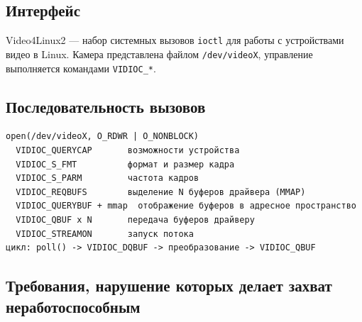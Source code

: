 \documentclass[11pt,a4paper]{article}
\theoremstyle{definition}
\theoremstyle{remark}
\begin{document}
\subsection{Интерфейс}

Video4Linux2 --- набор системных вызовов \texttt{ioctl} для работы с
устройствами видео в Linux. Камера представлена файлом \texttt{/dev/videoX},
управление выполняется командами \texttt{VIDIOC\_*}.

\subsection{Последовательность вызовов}

\begin{lstlisting}[style=shell]
open(/dev/videoX, O_RDWR | O_NONBLOCK)
  VIDIOC_QUERYCAP       возможности устройства
  VIDIOC_S_FMT          формат и размер кадра
  VIDIOC_S_PARM         частота кадров
  VIDIOC_REQBUFS        выделение N буферов драйвера (MMAP)
  VIDIOC_QUERYBUF + mmap  отображение буферов в адресное пространство
  VIDIOC_QBUF x N       передача буферов драйверу
  VIDIOC_STREAMON       запуск потока
цикл: poll() -> VIDIOC_DQBUF -> преобразование -> VIDIOC_QBUF
\end{lstlisting}

\subsection{Требования, нарушение которых делает захват неработоспособным}
\end{document}
